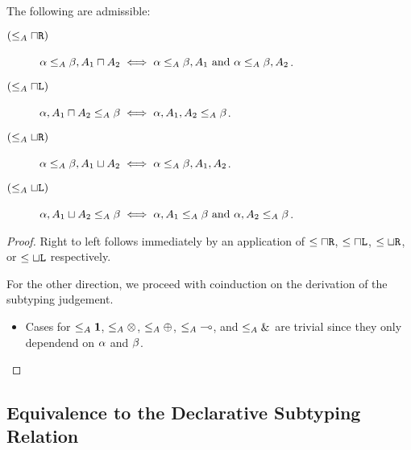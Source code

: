 \begin{lemma}[Invertibility]
  The following are admissible:
  \begin{description}
    \item[$(\le_A{\mathbin{\sqcap}\texttt{R}})$] $\alpha \le_A \beta, A_1 \mathbin{\sqcap} A_2 \iff  \alpha \le_A \beta, A_1 \text{ and } \alpha \le_A \beta, A_2$.
    \item[$(\le_A{\mathbin{\sqcap}\texttt{L}})$] $\alpha, A_1 \mathbin{\sqcap} A_2 \le_A \beta \iff \alpha, A_1, A_2 \le_A \beta$.

    \item[$(\le_A{\mathbin{\sqcup}\texttt{R}})$] $\alpha \le_A \beta, A_1 \mathbin{\sqcup} A_2 \iff \alpha \le_A \beta, A_1, A_2$.
    \item[$(\le_A{\mathbin{\sqcup}\texttt{L}})$] $\alpha, A_1 \mathbin{\sqcup} A_2 \le_A \beta \iff  \alpha, A_1 \le_A \beta \text{ and } \alpha, A_2 \le_A \beta$.
  \end{description}
\end{lemma}
\begin{proof}
  Right to left follows immediately by an application of $\le{\mathbin{\sqcap}\texttt{R}}$, $\le{\mathbin{\sqcap}\texttt{L}}$, $\le{\mathbin{\sqcup}\texttt{R}}$, or $\le{\mathbin{\sqcup}\texttt{L}}$ respectively.

  For the other direction, we proceed with coinduction on the derivation of the subtyping judgement.
  \begin{itemize}
    \item Cases for $\le_A{\mathbf{1}}$, $\le_A{\otimes}$, $\le_A{\oplus}$, $\le_A{\multimap}$, and $\le_A{\&}$ are trivial since they only dependend on $\alpha$ and $\beta$.
  \end{itemize}
\end{proof}


\subsection{Equivalence to the Declarative Subtyping Relation}


